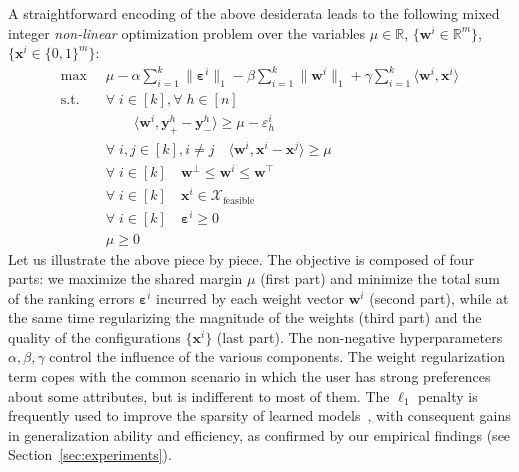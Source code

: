 \documentclass{article}
\renewcommand\[{\begin{equation}}
\renewcommand\]{\end{equation}}
\newcommand{\bbR}{\mathbb{R}}
\newcommand{\calvar}[1]{\ensuremath{\mathcal{#1}}}
\newcommand{\calX}{\calvar{X}}
\newcommand{\vecvar}[1]{\ensuremath{\boldsymbol{#1}}}
\newcommand{\vw}{\vecvar{w}}
\newcommand{\vx}{\vecvar{x}}
\newcommand{\vy}{\vecvar{y}}
\newcommand{\veps}{\vecvar{\varepsilon}}
\DeclareMathOperator*{\argmax}{argmax}
\newcommand{\stefano}[1]{{\bf \textcolor{green}{{\fbox{Stefano:} #1}}}}
\begin{document}

A straightforward encoding of the above desiderata leads to the
following mixed integer {\em non-linear} optimization problem over the
variables $\mu \in \bbR$, $\{ \vw^i \in \bbR^m \}$, $\{ \vx^i \in \{0,1\}^m \}$:
%
{\footnotesize
\begin{align}
    \max
        & \;\; \mu - \alpha \sum_{i=1}^k \| \veps^{i} \|_1 - \beta \sum_{i=1}^k \| \vw^{i} \|_1 + \gamma \sum_{i=1}^k \langle \vw^{i}, \vx^{i} \rangle
        \nonumber
    \\
    \text{s.t.}
        & \;\; \forall \; i \in [k], \forall \; h \in [n] \nonumber
    \\
        & \;\; \qquad \langle \vw^{i}, \vy^{h}_+ - \vy^{h}_- \rangle \ge \mu - \varepsilon^{i}_h \label{eq:wyconstr}
    \\
        & \;\; \forall \; i, j \in [k], i \neq j \quad \langle \vw^{i}, \vx^{i} - \vx^{j} \rangle \ge \mu \label{eq:wxconstr}
    \\
        & \;\; \forall \; i \in [k] \quad \vw^\bot \le \vw^{i} \le \vw^\top \label{eq:wbounds}
    \\
        & \;\; \forall \; i \in [k] \quad \vx^{i} \in \calX_{\text{feasible}} \label{eq:xbounds}
    \\
        & \;\; \forall \; i \in [k] \quad \veps^{i} \ge 0 \nonumber
    \\
        & \;\; \mu \ge 0 \nonumber
\end{align}
}
%
Let us illustrate the above piece by piece. The objective is composed
of four parts: we maximize the shared margin $\mu$ (first part) and
minimize the total sum of the ranking errors $\veps^i$ incurred by
each weight vector $\vw^{i}$ (second part), while at the same time
regularizing the magnitude of the weights (third part) and the quality
of the configurations $\{ \vx^{i} \}$ (last part). The non-negative
hyperparameters $\alpha,\beta,\gamma$ control the influence of the
various components. The weight regularization term copes with the
common scenario in which the user has strong preferences about
some attributes, but is indifferent to most of
them. %
The $\ell_1$ penalty is frequently used to improve the sparsity of
learned models~\cite{lasso,zhang2008,Hensinger2010}, with consequent
gains in generalization ability and efficiency, as confirmed by our
empirical findings (see Section~\ref{sec:experiments}).
\end{document}

